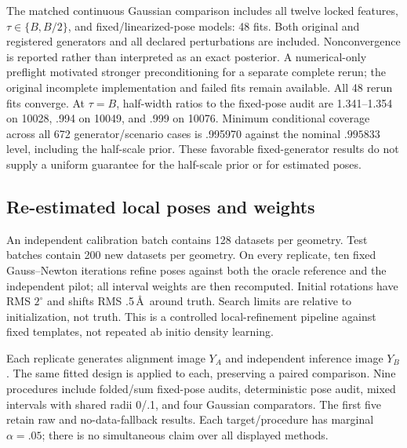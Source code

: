 \documentclass{article}
\begin{document}
The matched continuous Gaussian comparison includes all twelve locked features, $\tau\in\{B,B/2\}$, and fixed/linearized-pose models: 48 fits. Both original and registered generators and all declared perturbations are included. Nonconvergence is reported rather than interpreted as an exact posterior. A numerical-only preflight motivated stronger preconditioning for a separate complete rerun; the original incomplete implementation and failed fits remain available. All 48 rerun fits converge. At $\tau=B$, half-width ratios to the fixed-pose audit are 1.341--1.354 on 10028, .994 on 10049, and .999 on 10076. Minimum conditional coverage across all 672 generator/scenario cases is .995970 against the nominal $.995833$ level, including the half-scale prior. These favorable fixed-generator results do not supply a uniform guarantee for the half-scale prior or for estimated poses.

\subsection{Re-estimated local poses and weights}
An independent calibration batch contains 128 datasets per geometry. Test batches contain 200 new datasets per geometry. On every replicate, ten fixed Gauss--Newton iterations refine poses against both the oracle reference and the independent pilot; all interval weights are then recomputed. Initial rotations have RMS $2^\circ$ and shifts RMS .5\,\AA\ around truth. Search limits are relative to initialization, not truth. This is a controlled local-refinement pipeline against fixed templates, not repeated ab initio density learning.

Each replicate generates alignment image $Y_A$ and independent inference image $Y_B$. The same fitted design is applied to each, preserving a paired comparison. Nine procedures include folded/sum fixed-pose audits, deterministic pose audit, mixed intervals with shared radii 0/.1, and four Gaussian comparators. The first five retain raw and no-data-fallback results. Each target/procedure has marginal $\alpha=.05$; there is no simultaneous claim over all displayed methods.
\end{document}
